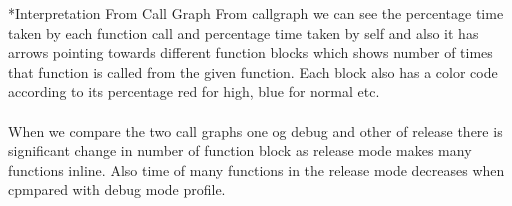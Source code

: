 \documentclass[11pt]{article}
\begin{document}
\begin{section}
\begin{subsection}*{Interpretation From Call Graph}
 From callgraph we can see the percentage time taken by each function call and percentage time taken by self and also it has arrows pointing towards different function blocks which shows number of times that function is called from the given function. Each block also has a color code according to its percentage red for high, blue for normal etc. 
\\\\
When we compare the two call graphs one og debug and other of release there is significant change in number of function block as release mode makes many functions inline. Also time of many functions in the release mode decreases when cpmpared with debug mode profile.
\end{subsection}

 

\end{section}
\end{document}
